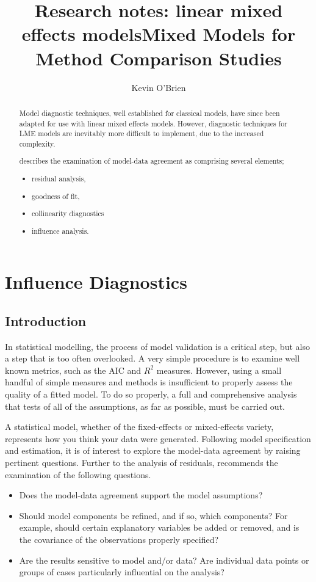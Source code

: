 \documentclass[12pt, a4paper]{report}
\title{Research notes: linear mixed effects models}
\author{ } \date{ }
\theoremstyle{plain}
\theoremstyle{definition}
\theoremstyle{remark}
\begin{document}
\author{Kevin O'Brien}
\title{Mixed Models for Method Comparison Studies}
\tableofcontents
\begin{abstract}
	Model diagnostic techniques, well established for classical models, have since been adapted for use with linear mixed effects models. However, diagnostic techniques for LME models are inevitably more difficult to implement, due to the increased complexity. \\ \bigskip
	
	
	\citet{schabenberger} describes the examination of model-data agreement as comprising several elements; \begin{itemize}
		\item residual analysis, 
		\item goodness of fit, 
		\item collinearity diagnostics
		\item influence analysis.
	\end{itemize} 
	
\end{abstract}
\chapter{Influence Diagnostics}




\section{Introduction}
In statistical modelling, the process of model validation is a critical step, but also a step that is too often overlooked. A very simple procedure is to examine well known
metrics, such as the AIC and $R^2$ measures. However, using a small handful of simple measures and methods is insufficient to properly assess the quality of a fitted model. To do so properly, a full and comprehensive
analysis that tests of all of the assumptions, as far as possible, must be carried out. 

A statistical model, whether of the fixed-effects or mixed-effects variety, represents how you think your data were generated. Following model specification and estimation, it is of interest to explore the model-data
agreement by raising pertinent questions. Further to the analysis of residuals, \citet{schab} recommends the examination of the following questions.
\begin{itemize}
	\item Does the model-data agreement support the model assumptions?
	\item Should model components be refined, and if so, which components? For example, should certain explanatory variables
	be added or removed, and is the covariance of the observations properly specified?
	\item Are the results sensitive to model and/or data? Are individual data points or groups of cases particularly
	influential on the analysis?
\end{itemize}
\end{document}
